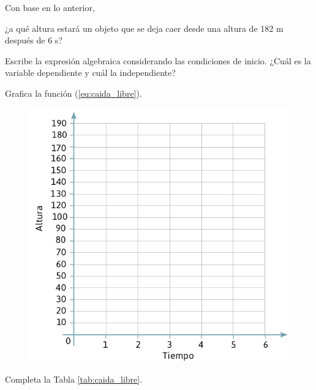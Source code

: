 Con base en lo anterior,
\begin{multicols}{2}
    \begin{parts}
        ¿a qué altura estará un objeto que se deja caer desde una altura de 182 m después de 6 s?

        \begin{solutionbox}{1.2cm}
        \end{solutionbox}

        Escribe la expresión algebraica considerando las condiciones de inicio. ¿Cuál es la variable dependiente y cuál la independiente?

        \begin{solutionbox}{1.2cm}
        \end{solutionbox}

        Grafica la función (\ref{eq:caida_libre}).

        \begin{figure}[H]
            \centering
            \includegraphics[width=\linewidth]{../images/20230326234935}
            \caption{}
            \label{fig:20230326234935}
        \end{figure}

        \columnbreak
        Completa la Tabla \ref{tab:caida_libre}.


\end{parts}
\end{multicols}
